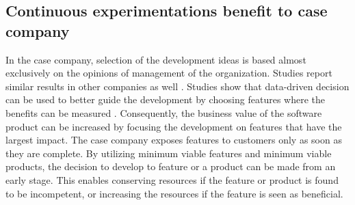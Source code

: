 \documentclass[english]{tktltiki2}
\theoremstyle{definition}
\theoremstyle{remark}
\begin{document}

\subsection{Continuous experimentations benefit to case company}




In the case company, selection of the development ideas is based almost exclusively on the opinions of management of the organization. Studies report similar results in other companies as well \cite{kohavi2007practical}. Studies show that data-driven decision can be used to better guide the development by choosing features where the benefits can be measured \cite{kohavi2007practical, moran2007wrong, kaushik}. Consequently, the business value of the software product can be increased by focusing the development on features that have the largest impact. The case company exposes features to customers only as soon as they are complete. By utilizing minimum viable features and minimum viable products, the decision to develop to feature or a product can be made from an early stage. This enables conserving resources if the feature or product is found to be incompetent, or increasing the resources if the feature is seen as beneficial. 
\end{document}
